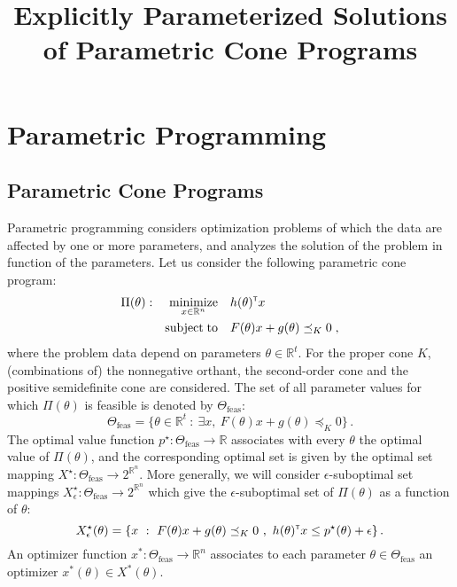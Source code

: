 \documentclass{article}
\newcommand{\R}{\mathbb{R}}        %
\renewcommand{\t}{^{\mbox{\tiny \sf T}}}    %
\newcommand{\ppar}{\theta}                  %
\newcommand{\Ppar}{\Theta}                  %
\DeclareMathOperator*{\minimize}{minimize}
\DeclareMathOperator*{\subj}{subject\;to}
\begin{document}
\title{Explicitly Parameterized Solutions of Parametric Cone Programs}

\maketitle



\section{Parametric Programming}\label{sec:overall_approach}


\subsection{Parametric Cone Programs}\label{subsec:parametric_program}

Parametric programming considers optimization problems of which the data are affected by one or more parameters, and analyzes the solution of the problem in function of the parameters. Let us consider the following parametric cone program:
\begin{gather}\label{eq:parametric_primal}
\begin{aligned}
\Pi(\ppar): && \minimize_{x\in\R^n} &&& h(\ppar)\t x\\
             && \subj                &&& F(\ppar)x+g(\ppar)\preceq_K 0 \;,%
\end{aligned}
\end{gather}
where the problem data depend on parameters $\ppar\in\R^t$. For the proper cone $K$, (combinations of) the nonnegative orthant, the second-order cone and the positive semidefinite cone are considered. The set of all parameter values for which $\Pi(\ppar)$ is feasible is denoted by $\Ppar_\text{feas}$:
\[ \Ppar_\text{feas} = \{\ppar\in\R^t ~:~ \exists x ,~ F(\ppar)x+g(\ppar)\preceq_K 0 \}\,.%
\]
The optimal value function $p^\star:\Ppar_\text{feas}\rightarrow\R$ associates with every $\ppar$ the optimal value of $\Pi(\ppar)$, and the corresponding optimal set is given by the optimal set mapping $X^\star:\Ppar_\text{feas}\rightarrow 2^{\R^n}$. More generally, we will consider $\epsilon$-suboptimal set mappings $X_\epsilon^\star:\Ppar_\text{feas}\rightarrow 2^{\R^n}$ which give the $\epsilon$-suboptimal set of $\Pi(\ppar)$ as a function of $\ppar$:
\[ X^\star_\epsilon(\ppar) = \{x ~:~ F(\ppar)x+g(\ppar)\preceq_K 0 ~,~ h(\ppar)\t x \leq p^\star(\ppar)+\epsilon\} \,.%
\]
An optimizer function $x^*:\Ppar_\text{feas}\rightarrow\R^n$ associates to each parameter $\ppar\in\Ppar_{\text{feas}}$ an optimizer $x^*(\ppar)\in X^*(\ppar)$.
\end{document}
